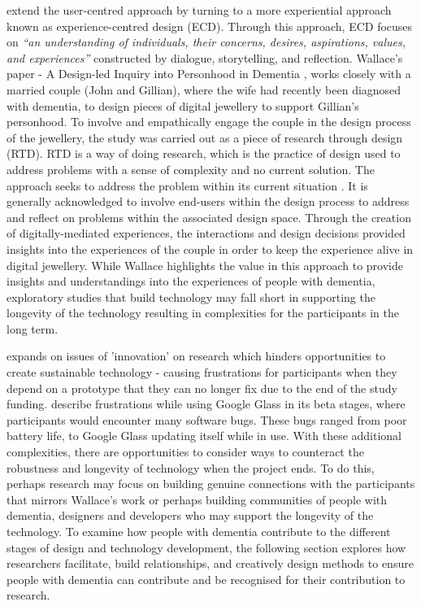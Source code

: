 \cite{wallace_design-led_2013} extend the user-centred approach by turning to a more experiential approach known as experience-centred design (ECD). Through this approach, ECD focuses on \textit{``an understanding of individuals, their concerns, desires, aspirations, values, and experiences''} \citep{morrissey_value_2017} constructed by dialogue, storytelling, and reflection. Wallace's paper - A Design-led Inquiry into Personhood in Dementia \citep{wallace_design-led_2013}, works closely with a married couple (John and Gillian), where the wife had recently been diagnosed with dementia, to design pieces of digital jewellery to support Gillian's personhood. To involve and empathically engage the couple in the design process of the jewellery, the study was carried out as a piece of research through design (RTD). RTD is a way of doing research, which is the practice of design used to address problems with a sense of complexity and no current solution. The approach seeks to address the problem within its current situation \citep{zimmerman_research_2007}. It is generally acknowledged to involve end-users within the design process to address and reflect on problems within the associated design space. Through the creation of digitally-mediated experiences, the interactions and design decisions provided \cite{wallace_design-led_2013} insights into the experiences of the couple in order to keep the experience alive in digital jewellery. While Wallace highlights the value in this approach to provide insights and understandings into the experiences of people with dementia, exploratory studies that build technology may fall short in supporting the longevity of the technology resulting in complexities for the participants in the long term. 

\cite{meurer_designing_2018} expands on issues of 'innovation' on research which hinders opportunities to create sustainable technology - causing frustrations for participants when they depend on a prototype that they can no longer fix due to the end of the study funding. \cite{vines_our_2017} describe frustrations while using Google Glass in its beta stages, where participants would encounter many software bugs. These bugs ranged from poor battery life, to Google Glass updating itself while in use. With these additional complexities, there are opportunities to consider ways to counteract the robustness and longevity of technology when the project ends. To do this, perhaps research may focus on building genuine connections with the participants that mirrors Wallace's work or perhaps building communities of people with dementia, designers and developers who may support the longevity of the technology. To examine how people with dementia contribute to the different stages of design and technology development, the following section explores how researchers facilitate, build relationships, and creatively design methods to ensure people with dementia can contribute and be recognised for their contribution to research.

